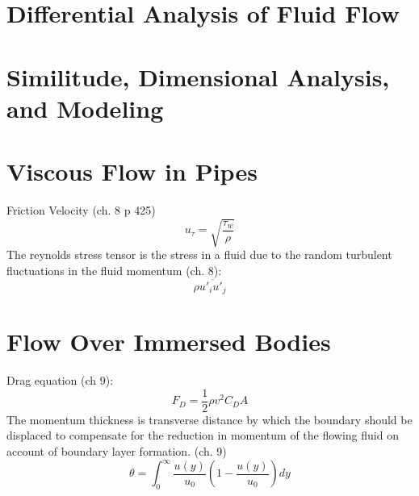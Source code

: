 \documentclass{article}
\begin{document}
%
%
\newpage
\section{Differential Analysis of Fluid Flow}



%
%
\newpage
\section{Similitude, Dimensional Analysis, and Modeling}



%
%
\newpage
\section{Viscous Flow in Pipes}

Friction Velocity (ch. 8 p 425)
\begin{equation}
  u_\tau = \sqrt{\frac{\tau_w}{\rho}}
\end{equation}
\newline
\newline
The reynolds stress tensor is the stress in a fluid due to the random turbulent fluctuations in the fluid momentum (ch. 8):
\begin{equation}
  \rho \overline{u'_i u'_j}
\end{equation}


%
%
\newpage
\section{Flow Over Immersed Bodies}

Drag equation (ch 9): 
\begin{equation}
  F_D = \frac{1}{2}\rho v^2 C_D A
\end{equation}
\newline
\newline
The momentum thickness is transverse distance by which the boundary should be displaced to compensate for the reduction in momentum of the flowing fluid on account of boundary layer formation. (ch. 9)
\begin{equation}
  \theta = \int^\infty_0 \frac{u(y)}{u_0}(1-\frac{u(y)}{u_0})dy
\end{equation}
\newline
\newline
\end{document}
